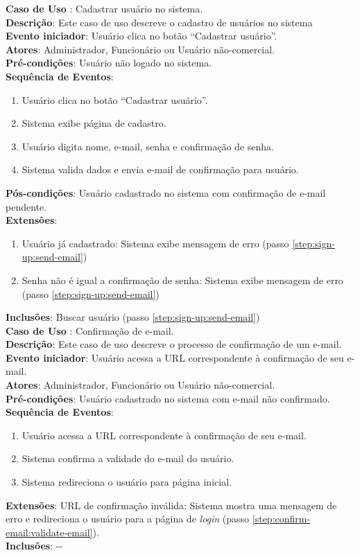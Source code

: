 \documentclass[]{politex}
\begin{document}
\noindent \textbf{Caso de Uso }: Cadastrar usuário no sistema.  \\
\textbf{Descrição}: Este caso de uso descreve o cadastro de usuários no sistema \\
\textbf{Evento iniciador}: Usuário clica no botão ``Cadastrar usuário''. \\
\textbf{Atores}: Administrador, Funcionário ou Usuário não-comercial. \\
\textbf{Pré-condições}: Usuário não logado no sistema. \\
\textbf{Sequência de Eventos}:
\begin{enumerate}
\item Usuário clica no botão ``Cadastrar usuário''.
\item Sistema exibe página de cadastro.
\item Usuário digita nome, e-mail, senha e confirmação de senha.
\item\label{step:sign-up:send-email} Sistema valida dados e envia e-mail de confirmação para usuário.
\end{enumerate}
\textbf{Pós-condições}: Usuário cadastrado no sistema com confirmação de e-mail pendente. \\
\textbf{Extensões}:
\begin{enumerate}
\item Usuário já cadastrado: Sistema exibe mensagem de erro (passo \ref{step:sign-up:send-email})
\item Senha não é igual a confirmação de senha: Sistema exibe mensagem de erro (passo \ref{step:sign-up:send-email})
\end{enumerate}
\textbf{Inclusões}: Buscar usuário (passo \ref{step:sign-up:send-email}) \\

\noindent \textbf{Caso de Uso }: Confirmação de e-mail. \\
\textbf{Descrição}: Este caso de uso descreve o processo de confirmação de um e-mail. \\
\textbf{Evento iniciador}: Usuário acessa a URL correspondente à confirmação de seu e-mail. \\
\textbf{Atores}: Administrador, Funcionário ou Usuário não-comercial. \\
\textbf{Pré-condições}: Usuário cadastrado no sistema com e-mail não confirmado. \\
\textbf{Sequência de Eventos}:
\begin{enumerate}
\item Usuário acessa a URL correspondente à confirmação de seu e-mail.
\item\label{step:confirm-email:validate-email} Sistema confirma a validade do e-mail do usuário.
\item Sistema redireciona o usuário para página inicial.
\end{enumerate}
\textbf{Extensões}: URL de confirmação inválida: Sistema mostra uma mensagem de
erro e redireciona o usuário para a página de \textit{login} (passo \ref{step:confirm-email:validate-email}). \\
\textbf{Inclusões}: -{}- \\
\end{document}
